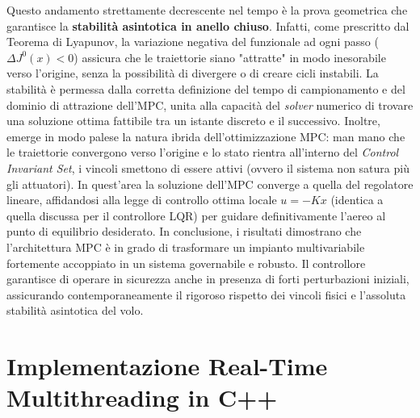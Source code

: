 Questo andamento strettamente decrescente nel tempo è la prova geometrica che garantisce la \textbf{stabilità asintotica in anello chiuso}. Infatti, come prescritto dal Teorema di Lyapunov, la variazione negativa del funzionale ad ogni passo ($\Delta J^0(x) < 0$) assicura che le traiettorie siano "attratte" in modo inesorabile verso l'origine, senza la possibilità di divergere o di creare cicli instabili. La stabilità è permessa dalla corretta definizione del tempo di campionamento e del dominio di attrazione dell'MPC, unita alla capacità del \textit{solver} numerico di trovare una soluzione ottima fattibile tra un istante discreto e il successivo. Inoltre, emerge in modo palese la natura ibrida dell'ottimizzazione MPC: man mano che le traiettorie convergono verso l'origine e lo stato rientra all'interno del \textit{Control Invariant Set}, i vincoli smettono di essere attivi (ovvero il sistema non satura più gli attuatori). In quest'area la soluzione dell'MPC converge a quella del regolatore lineare, affidandosi alla legge di controllo ottima locale $u = -Kx$ (identica a quella discussa per il controllore LQR) per guidare definitivamente l'aereo al punto di equilibrio desiderato. In conclusione, i risultati dimostrano che l'architettura MPC è in grado di trasformare un impianto multivariabile fortemente accoppiato in un sistema governabile e robusto. Il controllore garantisce di operare in sicurezza anche in presenza di forti perturbazioni iniziali, assicurando contemporaneamente il rigoroso rispetto dei vincoli fisici e l'assoluta stabilità asintotica del volo.
\part{Implementazione Real-Time Multithreading in C++}
